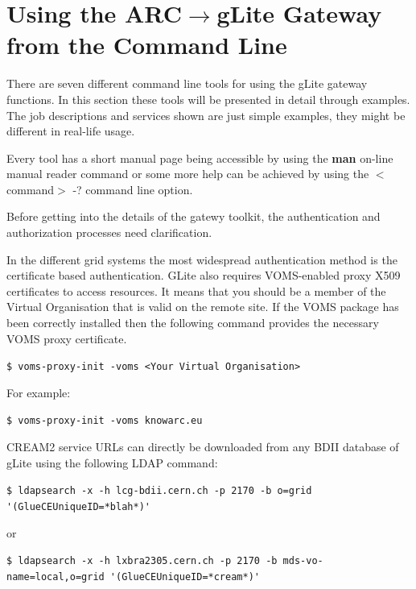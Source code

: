 \documentclass{article}
\begin{document}
\section{Using the ARC${\rightarrow}$gLite Gateway from the Command Line}
\label{Users guide}
There are seven different command line tools for using the gLite gateway functions. In this section these tools will be presented in detail through examples. The job descriptions and services shown are just simple examples, they might be different in real-life usage.\par
Every tool has a short manual page being accessible by using the \textbf{man} on-line manual reader command or some more help can be achieved by using the $<$command$>$ -? command line option.\par
Before getting into the details of the gatewy toolkit, the authentication and authorization processes need clarification.\par
In the different grid systems the most widespread authentication method is the certificate based authentication. GLite also requires VOMS-enabled proxy X509 certificates to access resources. It means that you should be a member of the Virtual Organisation that is valid on the remote site. If the VOMS package has been correctly installed then the following command provides the necessary VOMS proxy certificate.\par
\begin{shaded}\verb#$ voms-proxy-init -voms <Your Virtual Organisation>#\end{shaded}
For example:
\begin{shaded}\verb#$ voms-proxy-init -voms knowarc.eu#\end{shaded}
CREAM2 service URLs can directly be downloaded from any BDII database of gLite using the following LDAP command:
\begin{shaded}
\verb#$ ldapsearch -x -h lcg-bdii.cern.ch -p 2170 -b o=grid '(GlueCEUniqueID=*blah*)'#
\end{shaded}
or
\begin{shaded}
\verb#$ ldapsearch -x -h lxbra2305.cern.ch -p 2170 -b mds-vo-name=local,o=grid '(GlueCEUniqueID=*cream*)'#
\end{shaded}
\end{document}
